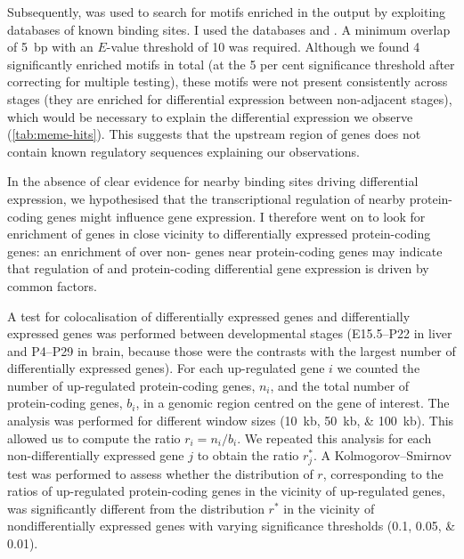 Subsequently,  \citep{Gupta:2007} was used to search for motifs
enriched in the  output by exploiting databases of known \tf binding
sites. I used the databases  and
. A minimum overlap of \SI{5}{bp} with an
\(E\)-value threshold of \num{10} was required. Although we found \num{4}
significantly enriched motifs in total (at the \num{5} per cent significance
threshold after correcting for multiple testing), these motifs were not present
consistently across stages (they are enriched for differential expression
between non-adjacent stages), which would be necessary to explain the
differential expression we observe (\cref{tab:meme-hits}). This suggests that
the upstream region of \trna genes does not contain known regulatory sequences
explaining our observations.

In the absence of clear evidence for nearby \tf binding sites driving
differential expression, we hypothesised that the transcriptional regulation of
nearby protein-coding genes might influence \trna gene expression. I therefore
went on to look for enrichment of \de \trna genes in close vicinity to
differentially expressed protein-coding genes: an enrichment of \de over non-\de
\trna genes near \de protein-coding genes may indicate that regulation of \trna
and protein-coding differential gene expression is driven by common factors.

A test for colocalisation of differentially expressed \trna genes and
differentially expressed \mrna genes was performed between developmental stages
(E15.5–P22 in liver and P4–P29 in brain, because those were the contrasts with
the largest number of differentially expressed \trna genes). For each
up-regulated \trna gene \(i\) we counted the number of up-regulated
protein-coding genes, \(n_i\), and the total number of pro\-te\-in-coding genes,
\(b_i\), in a genomic region centred on the \trna gene of interest. The analysis
was performed for different window sizes (\SIlist{10;50;100}{kb}). This allowed
us to compute the ratio \(r_i = {n_i}/{b_i}\). We repeated this analysis for
each non-differentially expressed \trna gene \(j\) to obtain the ratio
\(r_j^*\). A Kolmogorov–Smirnov test was performed to assess whether the
distribution of \(r\), corresponding to the ratios of up-regulated
protein-coding genes in the vicinity of up-regulated \trna genes, was
significantly different from the distribution \(r^*\) in the vicinity of
nondifferentially expressed \trna genes with varying significance thresholds
(\numlist{0.1;0.05;0.01}).

